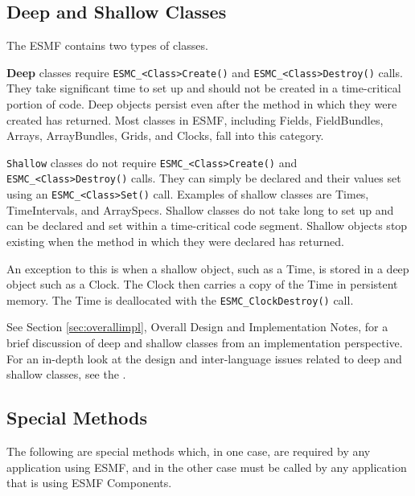 \subsection{Deep and Shallow Classes}
\label{sec:deepshallow}

The ESMF contains two types of classes. 

{\bf Deep} classes require
{\tt ESMC\_<Class>Create()} and {\tt ESMC\_<Class>Destroy()} calls.
They take significant time to set up and should not be created
in a time-critical portion of code.  Deep objects persist 
even after the method in which they were created has returned.
Most classes in ESMF, including Fields, FieldBundles, Arrays,
ArrayBundles, Grids, and Clocks, fall into this category.

{\tt Shallow} classes do not require {\tt ESMC\_<Class>Create()}
 and {\tt ESMC\_<Class>Destroy()} calls.  They can simply be declared
and their values set using an {\tt ESMC\_<Class>Set()} call.  
Examples of shallow classes are Times, TimeIntervals, and 
ArraySpecs.  Shallow classes do not take long to set up and can
be declared and set within
a time-critical code segment.  Shallow objects stop existing when
the method in which they were declared has returned.  

An exception to this is when a shallow object, such as a Time, 
is stored in a deep object such as a Clock.  The Clock then
carries a copy of the Time in persistent memory.  The Time is
deallocated with the {\tt ESMC\_ClockDestroy()} call.

See Section \ref{sec:overallimpl}, Overall Design and Implementation 
Notes, for a brief discussion of deep and shallow classes from 
an implementation perspective.  For an in-depth look at the design 
and inter-language issues related to deep and shallow classes,
see the .

\subsection{Special Methods}

The following are special methods which, in one case,
are required by any application using ESMF, and in the 
other case must be called by any application that is using 
ESMF Components.

